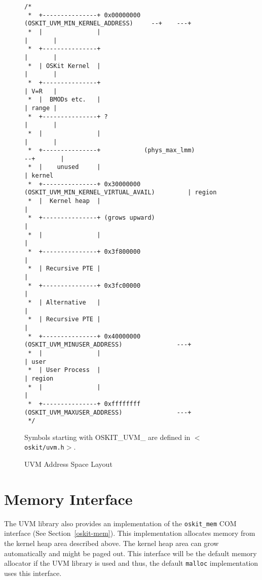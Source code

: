 \begin{figure}
\centering
\begin{verbatim}
/*
 *  +---------------+ 0x00000000 (OSKIT_UVM_MIN_KERNEL_ADDRESS)     --+    ---+
 *  |               |                                                 |       |
 *  +---------------+                                                 |       |
 *  | OSKit Kernel  |                                                 |       |
 *  +---------------+                                                 | V=R   |
 *  |  BMODs etc.   |                                                 | range |
 *  +---------------+ ?                                               |       |
 *  |               |                                                 |       |
 *  +---------------+            (phys_max_lmm)                     --+       | 
 *  |    unused     |                                                         | kernel
 *  +---------------+ 0x30000000 (OSKIT_UVM_MIN_KERNEL_VIRTUAL_AVAIL)         | region
 *  |  Kernel heap  |                                                         |
 *  +---------------+ (grows upward)                                          |
 *  |               |                                                         |
 *  +---------------+ 0x3f800000                                              |
 *  | Recursive PTE |                                                         |
 *  +---------------+ 0x3fc00000                                              |
 *  | Alternative   |                                                         |
 *  | Recursive PTE |                                                         |
 *  +---------------+ 0x40000000 (OSKIT_UVM_MINUSER_ADDRESS)               ---+
 *  |               |                                                         | user
 *  | User Process  |                                                         | region
 *  |               |                                                         | 
 *  +---------------+ 0xffffffff (OSKIT_UVM_MAXUSER_ADDRESS)               ---+
 */
\end{verbatim}
Symbols starting with OSKIT_UVM_ are defined in \texttt{$<$oskit/uvm.h$>$}.

\caption{UVM Address Space Layout}
\label{uvm-address-layout}
\end{figure}

\section{Memory Interface} 
\label{uvm-mem}
The UVM library also provides an implementation of the \texttt{oskit_mem}
COM interface (See Section~\ref{oskit-mem}).  This implementation
allocates memory from the kernel heap area described above.  The
kernel heap area can grow automatically and might be paged out.  This
interface will be the default memory allocator if the UVM library is
used and thus, the default \texttt{malloc} implementation
uses this interface.

